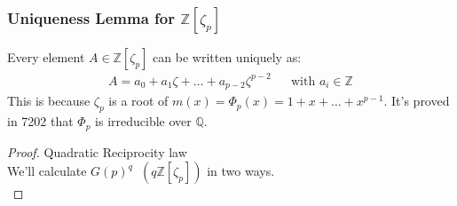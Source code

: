 \documentclass[11pt]{article}
\begin{document}
\subsubsection{Uniqueness Lemma for $\mathbb{Z}[\zeta_p]$}
Every element $A \in \mathbb{Z}[\zeta_p] $ can be written uniquely as:
\begin{align*}
	A = a_0 + a_1\zeta + \dots + a_{p-2}\zeta^{p-2} && \text{with } a_i \in \mathbb{Z} 
\end{align*}
This is because $\zeta_p$ is a root of $m(x) = \Phi_p(x) = 1+x+\dots +x^{p-1}$. It's proved in 7202 that $\Phi_p$ is irreducible over $\mathbb{Q}$.

\begin{proof}
	Quadratic Reciprocity law\\[1em]
	We'll calculate $G(p)^q \hspace{7pt}(q\mathbb{Z}[\zeta_p])$ in two ways.\\[1em]


\end{proof}
\end{document}
